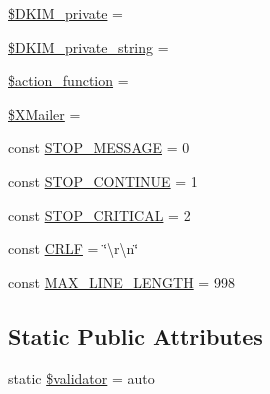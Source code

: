 \begin{DoxyCompactItemize}
\item 
\hyperlink{class_p_h_p_mailer_ac465c52f2f7ee6eade05ce0a65fbca61}{\$\+D\+K\+I\+M\+\_\+private} = \textquotesingle{}\textquotesingle{}
\item 
\hyperlink{class_p_h_p_mailer_a8b211d29c0349751ae550f4084b69ea3}{\$\+D\+K\+I\+M\+\_\+private\+\_\+string} = \textquotesingle{}\textquotesingle{}
\item 
\hyperlink{class_p_h_p_mailer_aa39c535046aa8919dc46727723a94a4a}{\$action\+\_\+function} = \textquotesingle{}\textquotesingle{}
\item 
\hyperlink{class_p_h_p_mailer_a1aca2514bdfdd3df32db20e762f0c85d}{\$\+X\+Mailer} = \textquotesingle{}\textquotesingle{}
\item 
const \hyperlink{class_p_h_p_mailer_a18ac47549c5fb56a395b374b3c23f04f}{S\+T\+O\+P\+\_\+\+M\+E\+S\+S\+A\+GE} = 0
\item 
const \hyperlink{class_p_h_p_mailer_afd1dcd18845b2e660d89726b20cd566e}{S\+T\+O\+P\+\_\+\+C\+O\+N\+T\+I\+N\+UE} = 1
\item 
const \hyperlink{class_p_h_p_mailer_a9f37e989efccad58c693cdb0481c881f}{S\+T\+O\+P\+\_\+\+C\+R\+I\+T\+I\+C\+AL} = 2
\item 
const \hyperlink{class_p_h_p_mailer_aa8bdd4d85e1ba0db8c09f92688c27ca6}{C\+R\+LF} = \char`\"{}\textbackslash{}r\textbackslash{}n\char`\"{}
\item 
const \hyperlink{class_p_h_p_mailer_a466169b7248c947b2d0d468a955573e7}{M\+A\+X\+\_\+\+L\+I\+N\+E\+\_\+\+L\+E\+N\+G\+TH} = 998
\end{DoxyCompactItemize}
\subsection*{Static Public Attributes}
\begin{DoxyCompactItemize}
\item 
static \hyperlink{class_p_h_p_mailer_aa4e00b38f53ef571bf77fc9c3e882972}{\$validator} = \textquotesingle{}auto\textquotesingle{}
\end{DoxyCompactItemize}
